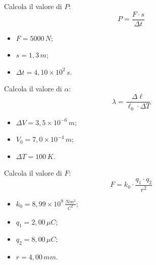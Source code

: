 \documentclass[12pt]{exam}
\begin{document}
\begin{questions}
\begin{multicols}{4}
\end{multicols}
\addpoints



\question Calcola il valore di $ P $:
\[ P = \frac{F \cdot s}{\Delta t} \]
\begin{multicols}{2}
\begin{itemize}
    \item $ F = 5000 \, N $;
    \item $ s = 1,3 \, m $;
    \item $ \Delta t = 4,10 \times 10^{2} \, s $.
\end{itemize}
\end{multicols}
\addpoints





\question Calcola il valore di $ \alpha $:
\[ \lambda = \frac{\Delta \ell}{\ell_0 \cdot \Delta T} \]
\begin{multicols}{2}
\begin{itemize}
    \item $ \Delta V = 3,5 \times 10^{-6} \, m $;
    \item $ V_0 = 7,0 \times 10^{-4} \, m $;
    \item $ \Delta T = 100 \, K $.
\end{itemize}
\end{multicols}
\addpoints




\question Calcola il valore di $ F $:
\[ F = k_0 \cdot \frac{q_1 \cdot q_2}{r^2} \]
\begin{multicols}{2}
\begin{itemize}
    \item $ k_0 = 8,99 \times 10^{9} \, \frac{Nm^2}{C^2} $;
    \item $ q_1 = 2,00 \, \mu C $;
    \item $ q_2 = 8,00 \, \mu C $;
    \item $ r = 4,00 \, mm $.
\end{itemize}
\end{multicols}
\addpoints



\end{questions}
\end{document}
